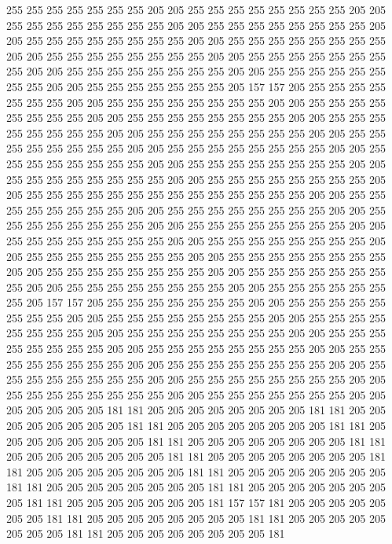 255 255 255 255 255 255 255 205 205 255 255 255 255 255 255 255 255 205 205 255
255 255 255 255 255 255 255 205 205 255 255 255 255 255 255 255 255 205 205 255
255 255 255 255 255 255 255 205 205 255 255 255 255 255 255 255 255 205 205 255
255 255 255 255 255 255 255 205 205 255 255 255 255 255 255 255 255 205 205 255
255 255 255 255 255 255 255 205 205 255 255 255 255 255 255 255 255 205 205 255
255 255 255 255 255 255 205 157 157 205 255 255 255 255 255 255 255 205 205 255
255 255 255 255 255 255 255 205 205 255 255 255 255 255 255 255 255 205 205 255
255 255 255 255 255 255 255 205 205 255 255 255 255 255 255 255 255 205 205 255
255 255 255 255 255 255 255 205 205 255 255 255 255 255 255 255 255 205 205 255
255 255 255 255 255 255 255 205 205 255 255 255 255 255 255 255 255 205 205 255
255 255 255 255 255 255 255 205 205 255 255 255 255 255 255 255 255 205 205 255
255 255 255 255 255 255 255 205 205 255 255 255 255 255 255 255 255 255 255 255
255 255 255 205 205 255 255 255 255 255 255 255 255 205 205 255 255 255 255 255
255 255 255 205 205 255 255 255 255 255 255 255 255 205 205 255 255 255 255 255
255 255 255 205 205 255 255 255 255 255 255 255 255 205 205 255 255 255 255 255
255 255 255 205 205 255 255 255 255 255 255 255 255 205 205 255 255 255 255 255
255 255 255 205 205 255 255 255 255 255 255 255 255 205 205 255 255 255 255 255
255 255 255 205 205 255 255 255 255 255 255 255 255 205 205 255 255 255 255 255
255 255 205 157 157 205 255 255 255 255 255 255 255 205 205 255 255 255 255 255
255 255 255 205 205 255 255 255 255 255 255 255 255 205 205 255 255 255 255 255
255 255 255 205 205 255 255 255 255 255 255 255 255 205 205 255 255 255 255 255
255 255 255 205 205 255 255 255 255 255 255 255 255 205 205 255 255 255 255 255
255 255 255 205 205 255 255 255 255 255 255 255 255 205 205 255 255 255 255 255
255 255 255 205 205 255 255 255 255 255 255 255 255 205 205 255 255 255 255 255
255 255 255 205 205 255 255 255 255 255 255 255 205 205 205 205 205 205 205 181
181 205 205 205 205 205 205 205 205 181 181 205 205 205 205 205 205 205 205 181
181 205 205 205 205 205 205 205 205 181 181 205 205 205 205 205 205 205 205 181
181 205 205 205 205 205 205 205 205 181 181 205 205 205 205 205 205 205 205 181
181 205 205 205 205 205 205 205 205 181 181 205 205 205 205 205 205 205 205 181
181 205 205 205 205 205 205 205 205 181 181 205 205 205 205 205 205 205 205 181
181 205 205 205 205 205 205 205 205 181 181 205 205 205 205 205 205 205 181 157
157 181 205 205 205 205 205 205 205 181 181 205 205 205 205 205 205 205 205 181
181 205 205 205 205 205 205 205 205 181 181 205 205 205 205 205 205 205 205 181
